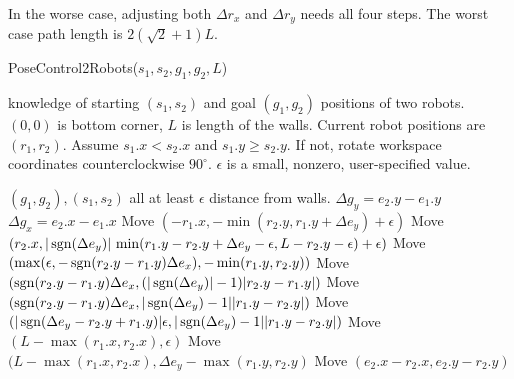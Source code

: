 In the worse case, adjusting both $\Delta r_x$ and $\Delta r_y$ needs all four steps. The worst case path length is $2(\sqrt{2}+1)L$.





\begin{algorithm}
\caption{PoseControl2Robots($s_1,s_2,g_1,g_2,L$)}\label{alg:PosControl2Robots}
\begin{algorithmic}[1]
\scriptsize
\Require knowledge of starting $(s_1,s_2)$ and goal $(g_1,g_2)$ positions of  two robots. 
$(0,0)$ is bottom corner,
 $L$ is length of the walls. Current robot positions are $(r_1,r_2)$.
 Assume $s_1.x < s_2.x$ and $s_1.y \geq s_2.y$. If not, rotate workspace coordinates counterclockwise $90^{\circ}$.
$\epsilon $ is a small, nonzero, user-specified value.
 
\Ensure $(g_1, g_2) , (s_1, s_2)$ all at least $\epsilon$ distance from walls.
\State $\Delta g_y = e_2.y - e_1.y$
\State $\Delta g_x = e_2.x - e_1.x$
\State Move $\left(-r_1.x , -\min \left(r_2.y , r_1.y+ \Delta e_y \right)+\epsilon \right)$ 
\State Move $ (r_2.x, |\operatorname{sgn}(\Delta e_y)| \, \min(r_1.y - r_2.y + \Delta e_y-\epsilon,L-r_2.y-\epsilon)+ \epsilon)$
\Statex {}
\State Move $(\max(\epsilon, -\operatorname{sgn}(r_2.y - r_1.y)\Delta e_x), -\min(r_1.y , r_2.y))$ 
\Statex {}
\State Move $(\operatorname{sgn}(r_2.y - r_1.y)\Delta e_x , (|\operatorname{sgn}(\Delta e_y)|-1) |r_2.y - r_1.y|)$ 
\State Move $(\operatorname{sgn}(r_2.y- r_1.y)\Delta e_x, |\operatorname{sgn}(\Delta e_y)-1| |r_1.y-r_2.y|)$ 
\Else
\State Move  $(|\operatorname{sgn}(\Delta e_y -r_2.y+ r_1.y)| \epsilon, |\operatorname{sgn}(\Delta e_y)-1| |r_1.y-r_2.y|)$ 
\EndIf
\State Move $(L - \max(r_1.x, r_2.x), \epsilon)$
\Else 
\State Move $(L - \max(r_1.x, r_2.x),\Delta e_y -\max(r_1.y, r_2.y)$ 
\Statex {}
\EndIf
\EndIf
\State Move $(e_2.x - r_2.x, e_2.y - r_2.y)$ 
\end{algorithmic}
\end{algorithm}






